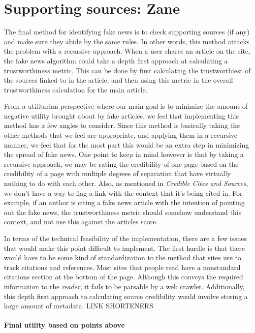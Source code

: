 \documentclass[12pt]{article}
\begin{document}
\section{Supporting sources: Zane}
The final method for identifying fake news is to check supporting sources (if any) and make sure they abide by the same rules. In other words, this method attacks the problem with a recursive approach. When a user shares an article on the site, the fake news algorithm could take a depth first approach at calculating a trustworthiness metric. This can be done by first calculating the trustworthiest of the sources linked to in the article, and then using this metric in the overall trustworthiness calculation for the main article. 

From a utilitarian perspective where our main goal is to minimize the amount of negative utility brought about by fake articles, we feel that implementing this method has a few angles to consider. Since this method is basically taking the other methods that we feel are appropriate, and applying them in a recursive manner, we feel that for the most part this would be an extra step in minimizing the spread of fake news. One point to keep in mind however is that by taking a recursive approach, we may be rating the credibility of one page based on the credibility of a page with multiple degrees of separation that have virtually nothing to do with each other. Also, as mentioned in \textit{Credible Cites and Sources}, we don't have a way to flag a link with the context that it's being cited in. For example, if an author is citing a fake news article with the intention of pointing out the fake news, the trustworthiness metric should somehow understand this context, and not use this against the articles score.

In terms of the technical feasibility of the implementation, there are a few issues that would make this point difficult to implement. The first hurdle is that there would have to be some kind of standardization to the method that sites use to track citations and references. Most sites that people read have a nonstandard citations section at the bottom of the page. Although this conveys the required information to the \textit{reader}, it fails to be parsable by a web crawler. Additionally, this depth first approach to calculating source credibility would involve storing a large amount of metadata. LINK SHORTENERS


\paragraph{Final utility based on points above}

\newpage


\end{document}
